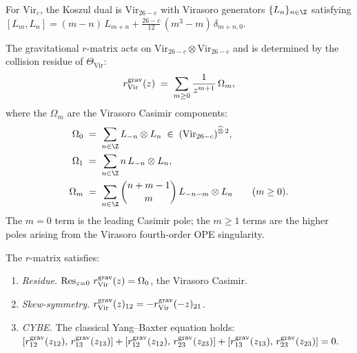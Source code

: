 \begin{construction}
\label{constr:thqg-V-vir-r-explicit}
For $\mathrm{Vir}_c$, the Koszul dual is $\mathrm{Vir}_{26-c}$
with Virasoro generators $\{L_n\}_{n \in \Z}$ satisfying
$[L_m, L_n] = (m-n)\,L_{m+n}
+ \frac{26-c}{12}\,(m^3-m)\,\delta_{m+n,0}$.

The gravitational $r$-matrix acts on
$\mathrm{Vir}_{26-c} \otimes \mathrm{Vir}_{26-c}$ and is determined
by the collision residue of $\Theta_{\mathrm{Vir}}$:
\begin{equation}\label{eq:thqg-V-vir-r-explicit}
r^{\mathrm{grav}}_{\mathrm{Vir}}(z)
\;=\;
\sum_{m \geq 0}
\frac{1}{z^{m+1}}\,
\Omega_m,
\end{equation}
where the $\Omega_m$ are the Virasoro Casimir components:
\begin{align}
\Omega_0
&\;=\;
\sum_{n \in \Z}
L_{-n} \otimes L_n
\;\in\;
(\mathrm{Vir}_{26-c})^{\widehat{\otimes}\,2},
\label{eq:thqg-V-vir-omega0} \\
\Omega_1
&\;=\;
\sum_{n \in \Z}
n\,L_{-n} \otimes L_n,
\label{eq:thqg-V-vir-omega1} \\
\Omega_m
&\;=\;
\sum_{n \in \Z}
\binom{n+m-1}{m}\,L_{-n-m} \otimes L_n
\qquad (m \geq 0).
\label{eq:thqg-V-vir-omegam}
\end{align}
The $m = 0$ term is the leading Casimir pole; the $m \geq 1$ terms
are the higher poles arising from the Virasoro fourth-order OPE
singularity.

The $r$-matrix satisfies:
\begin{enumerate}[label=\textup{(\roman*)}]
\item \emph{Residue.}\;
 $\operatorname{Res}_{z=0}\,r^{\mathrm{grav}}_{\mathrm{Vir}}(z) = \Omega_0$, the
 Virasoro Casimir.
\item \emph{Skew-symmetry.}\;
 $r^{\mathrm{grav}}_{\mathrm{Vir}}(z)_{12} = -r^{\mathrm{grav}}_{\mathrm{Vir}}(-z)_{21}$.
\item \emph{CYBE.}\;
 The classical Yang--Baxter equation holds:
 $[r^{\mathrm{grav}}_{12}(z_{12}),\,r^{\mathrm{grav}}_{13}(z_{13})]
 + [r^{\mathrm{grav}}_{12}(z_{12}),\,r^{\mathrm{grav}}_{23}(z_{23})]
 + [r^{\mathrm{grav}}_{13}(z_{13}),\,r^{\mathrm{grav}}_{23}(z_{23})]
 = 0.$
\end{enumerate}
\end{construction}

